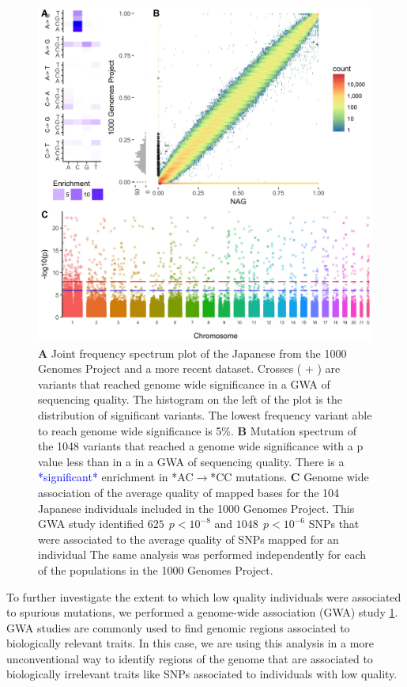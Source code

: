 \documentclass[9pt,lineno]{elife}
\newcommand{\todo}[1]{\textcolor{blue}{*#1*}}
\begin{document}
\begin{figure}
\includegraphics[width=\hsize,keepaspectratio]{Figure1.jpg}
\caption{
\textbf{A} 
Joint frequency spectrum plot of the Japanese from the 1000 Genomes Project and a more recent dataset.
Crosses ( + ) are variants that reached genome wide significance in a GWA of sequencing quality. 
The histogram on the left of the plot is the distribution of significant variants. 
The lowest frequency variant able to reach genome wide significance is 5\%.
\textbf{B} 
Mutation spectrum of the 1048 variants that reached a genome wide significance with a p value less than  in a in a GWA of sequencing quality. 
There is a \todo{significant} enrichment in *AC${\rightarrow}$*CC mutations. 
\textbf{C} 
Genome wide association of the average quality of mapped bases for the 104 Japanese individuals included in the 1000 Genomes Project. This GWA study identified $625\ \  p < 10^{-8}$ and $1048\ \ p < 10^{-6}$ SNPs that were associated to the average quality of SNPs mapped for an individual
The same analysis was performed independently for each of the populations in the 1000 Genomes Project. }
 \label{Figure1}
\end{figure}

To further investigate	 the extent to which low quality individuals were associated to spurious mutations, we performed a genome-wide association (GWA) study  \ref{Figure1}. GWA studies are commonly used to find genomic regions associated to biologically relevant traits. In this case, we are using this analysis in a more unconventional way to identify regions of the genome that are associated to biologically irrelevant traits like SNPs associated to individuals with low quality.
 
\end{document}
